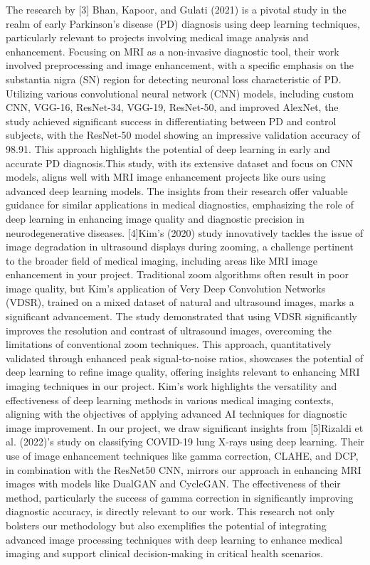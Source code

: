 \documentclass[conference]{IEEEtran}
\begin{document}
The research by [3] Bhan, Kapoor, and Gulati (2021) is a pivotal study in the realm of early Parkinson's disease (PD) diagnosis using deep learning techniques, particularly relevant to projects involving medical image analysis and enhancement. Focusing on MRI as a non-invasive diagnostic tool, their work involved preprocessing and image enhancement, with a specific emphasis on the substantia nigra (SN) region for detecting neuronal loss characteristic of PD.
Utilizing various convolutional neural network (CNN) models, including custom CNN, VGG-16, ResNet-34, VGG-19, ResNet-50, and improved AlexNet, the study achieved significant success in differentiating between PD and control subjects, with the ResNet-50 model showing an impressive validation accuracy of 98.91. This approach highlights the potential of deep learning in early and accurate PD diagnosis.This study, with its extensive dataset and focus on CNN models, aligns well with MRI image enhancement projects like ours using advanced deep learning models. The insights from their research offer valuable guidance for similar applications in medical diagnostics, emphasizing the role of deep learning in enhancing image quality and diagnostic precision in neurodegenerative diseases.
[4]Kim's (2020) study innovatively tackles the issue of image degradation in ultrasound displays during zooming, a challenge pertinent to the broader field of medical imaging, including areas like MRI image enhancement in your project. Traditional zoom algorithms often result in poor image quality, but Kim's application of Very Deep Convolution Networks (VDSR), trained on a mixed dataset of natural and ultrasound images, marks a significant advancement. The study demonstrated that using VDSR significantly improves the resolution and contrast of ultrasound images, overcoming the limitations of conventional zoom techniques. This approach, quantitatively validated through enhanced peak signal-to-noise ratios, showcases the potential of deep learning to refine image quality, offering insights relevant to enhancing MRI imaging techniques in our project. Kim's work highlights the versatility and effectiveness of deep learning methods in various medical imaging contexts, aligning with the objectives of applying advanced AI techniques for diagnostic image improvement.
In our project, we draw significant insights from [5]Rizaldi et al. (2022)'s study on classifying COVID-19 lung X-rays using deep learning. Their use of image enhancement techniques like gamma correction, CLAHE, and DCP, in combination with the ResNet50 CNN, mirrors our approach in enhancing MRI images with models like DualGAN and CycleGAN. The effectiveness of their method, particularly the success of gamma correction in significantly improving diagnostic accuracy, is directly relevant to our work. This research not only bolsters our methodology but also exemplifies the potential of integrating advanced image processing techniques with deep learning to enhance medical imaging and support clinical decision-making in critical health scenarios.
\end{document}
